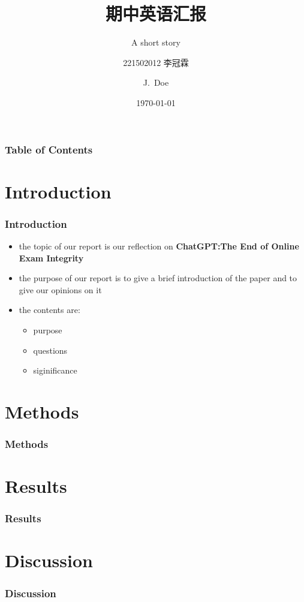 \documentclass{beamer}
\title[Mid Term Repoeort]
{期中英语汇报}
\subtitle{A short story}
\author[Eric, Doe] %
{221502012 李冠霖\inst{1} \and J.~Doe\inst{1}}
\institute[NJU] %
{
\inst{1}%
Nanjing University
\and
}
\date[NJU 2023] %
{\today}
\begin{document}
\frame{\titlepage}

\begin{frame}
\frametitle{Table of Contents}
\tableofcontents
\end{frame}
\section{Introduction}

\begin{frame}
    \frametitle{Introduction}
    \begin{itemize}
        \item the topic of our report is our reflection on  \textbf{ChatGPT:The End of Online Exam Integrity}
        \item the purpose of our report is to give a brief introduction of the paper and to give our opinions on it
        \item the contents are:
        \begin{itemize}
            \item purpose
            \item questions
            \item siginificance
        \end{itemize}
    \end{itemize}
\end{frame}

\section{Methods}
\begin{frame}
    \frametitle{Methods}
\end{frame}

\section{Results}
\begin{frame}
    \frametitle{Results}
\end{frame}

\section{Discussion}
\begin{frame}
    \frametitle{Discussion}
\end{frame}
\end{document}
